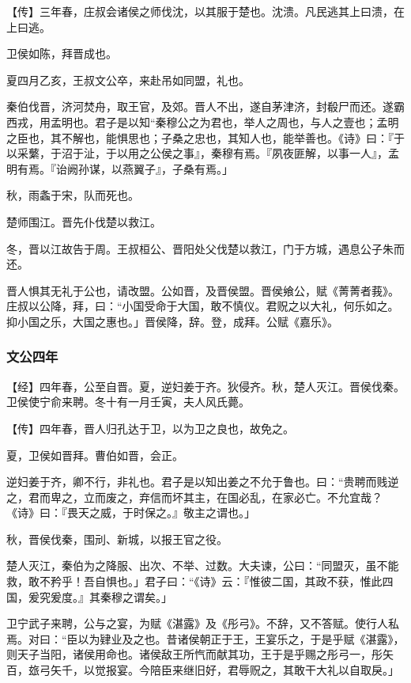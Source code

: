 \documentclass[]{article}
\begin{document}
【传】三年春，庄叔会诸侯之师伐沈，以其服于楚也。沈溃。凡民逃其上曰溃，在上曰逃。

卫侯如陈，拜晋成也。

夏四月乙亥，王叔文公卒，来赴吊如同盟，礼也。

秦伯伐晋，济河焚舟，取王官，及郊。晋人不出，遂自茅津济，封殽尸而还。遂霸西戎，用孟明也。君子是以知``秦穆公之为君也，举人之周也，与人之壹也；孟明之臣也，其不解也，能惧思也；子桑之忠也，其知人也，能举善也。《诗》曰：『于以采蘩，于沼于沚，于以用之公侯之事』，秦穆有焉。『夙夜匪解，以事一人』，孟明有焉。『诒阙孙谋，以燕翼子』，子桑有焉。」

秋，雨螽于宋，队而死也。

楚师围江。晋先仆伐楚以救江。

冬，晋以江故告于周。王叔桓公、晋阳处父伐楚以救江，门于方城，遇息公子朱而还。

晋人惧其无礼于公也，请改盟。公如晋，及晋侯盟。晋侯飨公，赋《菁菁者莪》。庄叔以公降，拜，曰：``小国受命于大国，敢不慎仪。君贶之以大礼，何乐如之。抑小国之乐，大国之惠也。」晋侯降，辞。登，成拜。公赋《嘉乐》。

\hypertarget{header-n1089}{%
\subsubsection{文公四年}\label{header-n1089}}

【经】四年春，公至自晋。夏，逆妇姜于齐。狄侵齐。秋，楚人灭江。晋侯伐秦。卫侯使宁俞来聘。冬十有一月壬寅，夫人风氏薨。

【传】四年春，晋人归孔达于卫，以为卫之良也，故免之。

夏，卫侯如晋拜。曹伯如晋，会正。

逆妇姜于齐，卿不行，非礼也。君子是以知出姜之不允于鲁也。曰：``贵聘而贱逆之，君而卑之，立而废之，弃信而坏其主，在国必乱，在家必亡。不允宜哉？《诗》曰：『畏天之威，于时保之。』敬主之谓也。」

秋，晋侯伐秦，围刓、新城，以报王官之役。

楚人灭江，秦伯为之降服、出次、不举、过数。大夫谏，公曰：``同盟灭，虽不能救，敢不矜乎！吾自惧也。」君子曰：``《诗》云：『惟彼二国，其政不获，惟此四国，爰究爰度。』其秦穆之谓矣。」

卫宁武子来聘，公与之宴，为赋《湛露》及《彤弓》。不辞，又不答赋。使行人私焉。对曰：``臣以为肄业及之也。昔诸侯朝正于王，王宴乐之，于是乎赋《湛露》，则天子当阳，诸侯用命也。诸侯敌王所忾而献其功，王于是乎赐之彤弓一，彤矢百，玈弓矢千，以觉报宴。今陪臣来继旧好，君辱贶之，其敢干大礼以自取戾。」
\end{document}
